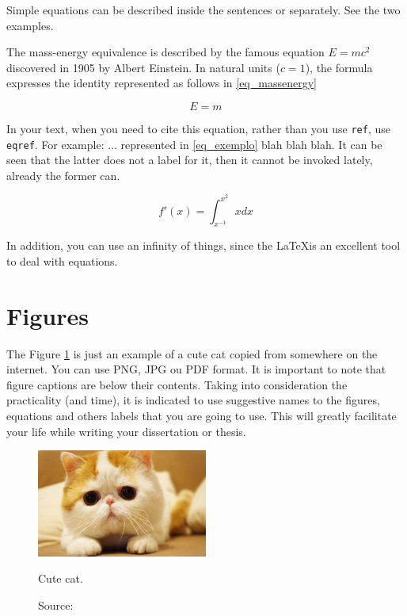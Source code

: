 Simple equations can be described inside the sentences or separately. See the two examples.

The mass-energy equivalence is described by the famous equation $E=mc^2$ discovered in 1905 by Albert Einstein. 
In natural units ($c = 1$), the formula expresses the identity represented as follows in \eqref{eq_massenergy}
 
\begin{equation}
\label{eq_massenergy}
E=m
\end{equation}

In your text, when you need to cite this equation, rather than you use \texttt{ref}, use \texttt{eqref}. For example: $\hdots$ represented in \eqref{eq_exemplo} blah blah blah. It can be seen that the latter does not a label for it, then it cannot be invoked lately, already the former can.

\begin{equation}
\label{eq_exemplo}
f'(x) = \int^{x^2}_{x^{-1}} xdx 
\end{equation}

In addition, you can use an infinity of things, since the \LaTeX is an excellent tool to deal with equations.


\section{Figures}

The Figure \ref{fig_gatofofo} is just an example of a cute cat copied from somewhere on the internet. You can use PNG, JPG ou PDF format. It is important to note that figure captions are below their contents. Taking into consideration the practicality (and time), it is indicated to use suggestive names to the figures, equations and others labels that you are going to use. This will greatly facilitate your life while writing your dissertation or thesis.

\begin{figure}[htb] 
    \centering
    \includegraphics[width=0.5\textwidth]{figures/gatofofo.PNG}
    \caption{Cute cat.}
    \label{fig_gatofofo}
    \caption*{Source: \cite{Babington1993book}}
\end{figure}


